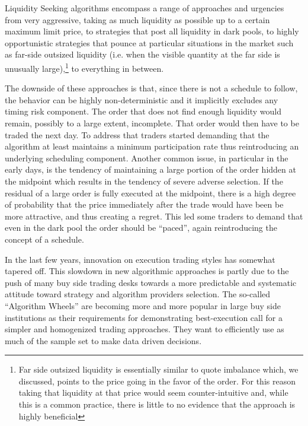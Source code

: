 Liquidity Seeking algorithms encompass a range of approaches and urgencies from very aggressive, taking as much liquidity as possible up to a certain maximum limit price, to strategies that post all liquidity in dark pools, to highly opportunistic strategies that pounce at particular situations in the market such as far-side outsized liquidity (i.e. when the visible quantity at the far side is unusually large),\footnote{Far side outsized liquidity is essentially similar to quote imbalance which, we discussed, points to the price going in the favor of the order. For this reason taking that liquidity at that price would seem counter-intuitive and, while this is a common practice,  there is little to no evidence that the approach is highly beneficial} to everything in between.


The downside of these approaches is that, since there is not a schedule to follow, the behavior can be highly non-deterministic and it implicitly excludes any timing risk component. The order that does not find enough liquidity would remain, possibly to a large extent, incomplete. That order would then have to be traded the next day. To address that traders started demanding that the algorithm at least maintains a minimum participation rate thus reintroducing an underlying scheduling component. Another common issue, in particular in the early days, is the tendency of maintaining a large portion of the order hidden at the midpoint which results in the tendency of severe  adverse selection. If the residual of a large order is fully executed at the midpoint, there is a high degree of probability that the price immediately after the trade would have been be more attractive, and thus creating a regret. This led some traders to demand that even in the dark pool the order should be ``paced'', again reintroducing the concept of a schedule.


In the last few years,  innovation on execution trading styles  has somewhat tapered off. This slowdown in new algorithmic approaches is partly due to the push of many buy side trading desks towards a more predictable and systematic attitude toward strategy and algorithm providers selection. The so-called ``Algorithm Wheels'' are becoming more and more popular in large buy side institutions as their requirements for demonstrating best-execution call for a simpler and homogenized trading approaches. They want to efficiently use as much of the sample set to make data driven decisions. 


